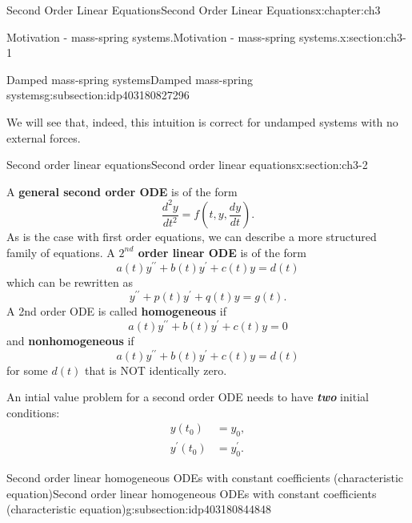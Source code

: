 \documentclass[oneside,10pt,]{book}
\newcommand{\alert}[1]{\textbf{\textit{#1}}}
\newcommand{\terminology}[1]{\textbf{#1}}
\numberwithin{equation}{section}
\numberwithin{equation}{section}
\newcommand{\amp}{&}
\begin{document}
\begin{chapterptx}{Second Order Linear Equations}{}{Second Order Linear Equations}{}{}{x:chapter:ch3}
\begin{sectionptx}{Motivation - mass-spring systems.}{}{Motivation - mass-spring systems.}{}{}{x:section:ch3-1}
\begin{subsectionptx}{Damped mass-spring systems}{}{Damped mass-spring systems}{}{}{g:subsection:idp403180827296}
\begin{enumerate}
\end{enumerate}
We will see that, indeed, this intuition is correct for undamped systems with no external forces.%
\end{subsectionptx}
\end{sectionptx}
%
%
\typeout{************************************************}
\typeout{************************************************}
%
\begin{sectionptx}{Second order linear equations}{}{Second order linear equations}{}{}{x:section:ch3-2}
\begin{introduction}{}%
A \terminology{general second order ODE} is of the form%
\begin{equation*}
\frac{d^{2}y}{dt^{2}}=f\left(t,y,\frac{dy}{dt}\right).
\end{equation*}
As is the case with first order equations, we can describe a more structured family of equations. A \terminology{\(2^{nd}\) order linear ODE} is of the form%
\begin{equation*}
a(t)y^{\prime\prime}+b(t)y^{\prime}+c(t)y=d(t)
\end{equation*}
which can be rewritten as%
\begin{equation*}
y^{\prime\prime}+p(t)y^{\prime}+q(t)y=g(t).
\end{equation*}
A 2nd order ODE is called \terminology{homogeneous} if%
\begin{equation*}
a(t)y^{\prime\prime}+b(t)y^{\prime}+c(t)y=0
\end{equation*}
and \terminology{nonhomogeneous} if%
\begin{equation*}
a(t)y^{\prime\prime}+b(t)y^{\prime}+c(t)y=d(t)
\end{equation*}
for some \(d(t)\) that is NOT identically zero.%
\par
An intial value problem for a second order ODE needs to have \alert{two} initial conditions:%
\begin{align*}
y(t_{0}) \amp =y_{0},\\
y^{\prime}(t_{0}) \amp =y_{0}^{\prime}.
\end{align*}
%
\end{introduction}%
%
%
\typeout{************************************************}
\typeout{************************************************}
%
\begin{subsectionptx}{Second order linear homogeneous ODEs with constant coefficients (characteristic equation)}{}{Second order linear homogeneous ODEs with constant coefficients (characteristic equation)}{}{}{g:subsection:idp403180844848}

\end{subsectionptx}
\end{sectionptx}
\end{chapterptx}
\end{document}
